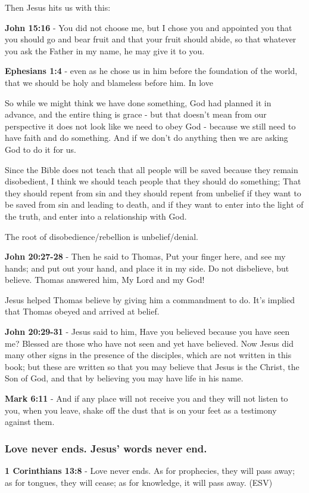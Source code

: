 \documentclass[11pt]{article}
\begin{document}
Then Jesus hits us with this:

\textbf{John 15:16} - You did not choose me, but I chose you and appointed you that you should go and bear fruit and that your fruit should abide, so that whatever you ask the Father in my name, he may give it to you.

\textbf{Ephesians 1:4} - even as he chose us in him before the foundation of the world, that we should be holy and blameless before him. In love

So while we might think we have done something, God had planned it in advance, and the entire thing is grace - but that doesn't mean from our perspective it does not look like we need to obey God - because we still need to have faith and do something. And if we don't do anything then we are asking God to do it for us.

Since the Bible does not teach that all people will be saved because they remain disobedient, I think we should teach people that they should do something; That they should repent from sin and they should repent from unbelief if they want to be saved from sin and leading to death, and if they want to enter into the light of the truth, and enter into a relationship with God.

The root of disobedience/rebellion is unbelief/denial.

\textbf{John 20:27-28} - Then he said to Thomas, Put your finger here, and see my hands; and put out your hand, and place it in my side. Do not disbelieve, but believe. Thomas answered him, My Lord and my God!

Jesus helped Thomas believe by giving him a commandment to do. It's implied that Thomas obeyed and arrived at belief.

\textbf{John 20:29-31} - Jesus said to him, Have you believed because you have seen me? Blessed are those who have not seen and yet have believed.  Now Jesus did many other signs in the presence of the disciples, which are not written in this book; but these are written so that you may believe that Jesus is the Christ, the Son of God, and that by believing you may have life in his name.

\textbf{Mark 6:11} - And if any place will not receive you and they will not listen to you, when you leave, shake off the dust that is on your feet as a testimony against them.

\subsubsection{Love never ends. Jesus' words never end.}
\label{sec:orgb728c4d}
\textbf{1 Corinthians 13:8} -  Love never ends.  As for prophecies, they will pass away; as for tongues, they will cease; as for knowledge, it will pass away. (ESV)
\end{document}
